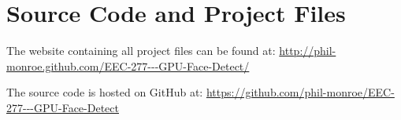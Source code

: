\documentclass[12pt] {article}
\begin{document}
\section{Source Code and Project Files}

\hspace*{1.5em}The website containing all project files can be found at:
\newline \url {http://phil-monroe.github.com/EEC-277---GPU-Face-Detect/}
\vspace{5 mm}

The source code is hosted on GitHub at:
\newline \url {https://github.com/phil-monroe/EEC-277---GPU-Face-Detect}
\end{document}
